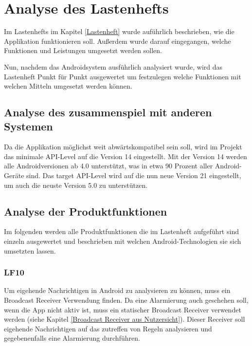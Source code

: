 \section{Analyse des Lastenhefts}
Im Lastenhefts im Kapitel \ref{Lastenheft} wurde auf\"uhrlich beschrieben, wie die Applikation funktionieren soll. Au\ss{}erdem wurde darauf eingegangen, welche Funktionen und Leistungen umgesetzt werden sollen. 

Nun, nachdem das Androidsystem ausf\"uhrlich analysiert wurde, wird das Lastenheft Punkt f\"ur Punkt ausgewertet um festzulegen welche Funktionen mit welchen Mitteln umgesetzt werden k\"onnen.

\subsection{Analyse des zusammenspiel mit anderen Systemen}
Da die Applikation m\"oglichst weit abw\"artskompatibel sein soll, wird im Projekt das minimale API-Level auf die Version 14 eingestellt. Mit der Version 14 werden alle Androidversionen ab 4.0 unterst\"utzt, was in etwa 90 Prozent aller Android-Ger\"ate sind. Das target API-Level wird auf die nun neue Version 21 eingestellt, um auch die neuste Version 5.0 zu unterst\"utzen. \cite{AndroidVerteilung} 

\subsection{Analyse der Produktfunktionen}
Im folgenden werden alle Produktfunktionen die im Lastenheft aufgef\"uhrt sind einzeln ausgewertet und beschrieben mit welchen Android-Technologien sie sich umsetzten lassen.

\subsubsection{LF10}
Um eigehende Nachrichtigen in Android zu analysieren zu k\"onnen, muss ein Broadcast Receiver Verwendung finden. Da eine Alarmierung auch geschehen soll, wenn die App nicht aktiv ist, muss ein statischer Broadcast Receiver verwendet werden (siehe Kapitel \ref{Broadcast Receiver aus Nutzersicht}). Dieser Receiver soll eigehende Nachrichtigen auf das zutreffen von Regeln analysieren und gegebenenfalls eine Alarmierung durchf\"uhren. 

